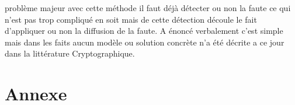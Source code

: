 \documentclass[a4paper]{report}
\begin{document}
problème majeur avec cette méthode il faut déjà détecter ou non la faute ce qui n'est pas trop compliqué en soit mais de cette détection découle le fait d'appliquer ou non la diffusion de la faute. A énoncé verbalement c'est simple mais dans les faits aucun modèle ou solution concrète n'a été décrite a ce jour dans la littérature Cryptographique.
		
		\chapter{Annexe}


		
\end{document}
